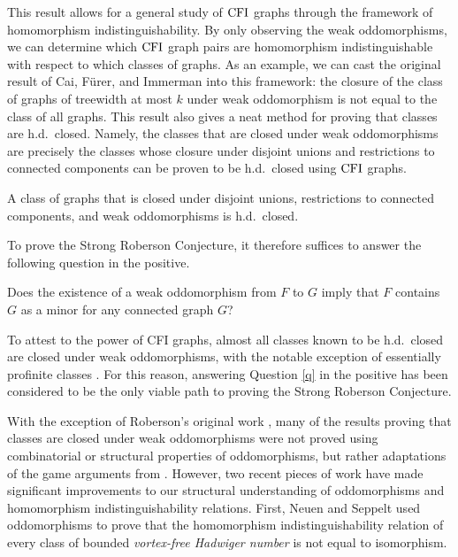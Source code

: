 \documentclass[11pt]{article}
\begin{document}
This result allows for a general study of $\operatorname{CFI}$ graphs through the framework of homomorphism indistinguishability. By only observing the weak oddomorphisms, we can determine which $\operatorname{CFI}$ graph pairs are homomorphism indistinguishable with respect to which classes of graphs. As an example, we can cast the original result of Cai, Fürer, and Immerman into this framework: the closure of the class of graphs of treewidth at most $k$ under weak oddomorphism is not equal to the class of all graphs.
This result also gives a neat method for proving that classes are h.d.\ closed. Namely, the classes that are closed under weak oddomorphisms are precisely the classes whose closure under disjoint unions and restrictions to connected components can be proven to be h.d.\ closed using $\operatorname{CFI}$ graphs. 
\begin{theorem}
\label{thm:oddo-implies-hdclosed}
    A class of graphs that is closed under disjoint unions, restrictions to connected components, and weak oddomorphisms is h.d.\ closed.
\end{theorem}
To prove the Strong Roberson Conjecture, it therefore suffices to answer the following question in the positive.
\begin{question}
\label{q}
    Does the existence of a weak oddomorphism from $F$ to $G$ imply that $F$ contains $G$ as a minor for any connected graph $G$?
\end{question}
To attest to the power of CFI graphs, almost all classes known to be h.d.\ closed are closed under weak oddomorphisms, with the notable exception of essentially profinite classes \cite{Seppelt2024:logical}.
For this reason, answering Question \ref{q} in the positive has been considered to be the only viable path to proving the Strong Roberson Conjecture. 
\par
With the exception of Roberson's original work \cite{roberson2022oddomorphisms}, many of the results proving that classes are closed under weak oddomorphisms \cite{neuen2023homomorphism, fluck2023goingdeepgoingwide, schindling:LIPIcs.MFCS.2025.89} were not proved using combinatorial or structural properties of oddomorphisms, but rather adaptations of the game arguments from \cite{Dawar2007thepowerofcounting}.
However, two recent pieces of work have made significant improvements to our structural understanding of oddomorphisms and homomorphism indistinguishability relations. 
First, Neuen and Seppelt \cite{neuen2026distinguishinggraphscountinghomomorphisms} used oddomorphisms to prove that the homomorphism indistinguishability relation of every class of bounded \emph{vortex-free Hadwiger number} is not equal to isomorphism. 
\end{document}
